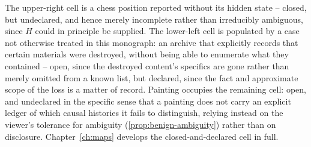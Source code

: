 The upper-right cell is a chess position reported without its hidden
state -- closed, but undeclared, and hence merely incomplete rather than
irreducibly ambiguous, since $H$ could in principle be supplied. The
lower-left cell is populated by a case not otherwise treated in this
monograph: an archive that explicitly records that certain materials were
destroyed, without being able to enumerate what they contained -- open,
since the destroyed content's specifics are gone rather than merely
omitted from a known list, but declared, since the fact and approximate
scope of the loss is a matter of record. Painting occupies the remaining
cell: open, and undeclared in the specific sense that a painting does not
carry an explicit ledger of which causal histories it fails to
distinguish, relying instead on the viewer's tolerance for ambiguity
(\cref{prop:benign-ambiguity}) rather than on disclosure.
Chapter~\ref{ch:maps} develops the closed-and-declared cell in full.
